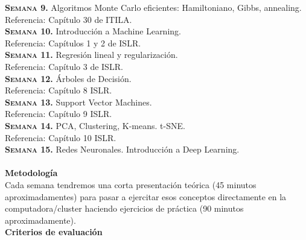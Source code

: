 \documentclass[letterpaper,10pt,onecolumn]{article}
\begin{document}
\noindent\textbf{\textsc{Semana 9.}}
Algoritmos Monte Carlo eficientes: Hamiltoniano, Gibbs, annealing. \\
Referencia: Cap\'itulo 30 de ITILA.
\\[-0.3cm] 

\noindent\textbf{\textsc{Semana 10.}}  
Introducci\'on a Machine Learning. \\
Referencia: Cap\'itulos 1 y 2 de ISLR.
\\[-0.3cm] 

\noindent\textbf{\textsc{Semana 11.}}  
Regresi\'on lineal y regularizaci\'on.\\
Referencia: Cap\'itulo 3 de ISLR.
\\[-0.3cm]

\noindent\textbf{\textsc{Semana 12.}} 
\'Arboles de Decisi\'on.\\
Referencia: Cap\'itulo 8 ISLR. 
\\[-0.3cm]  

\noindent\textbf{\textsc{Semana 13.}} 
Support Vector Machines.\\
Referencia: Cap\'itulo 9 ISLR.
\\[-0.3cm] 

\noindent\textbf{\textsc{Semana 14.}} 
PCA, Clustering, K-means. t-SNE.\\
Referencia: Cap\'itulo 10 ISLR. 
\\[-0.3cm] 

\noindent\textbf{\textsc{Semana 15.}} 
Redes Neuronales. Introducci\'on a Deep Learning.\\
\\[-0.1cm]  


\noindent\textbf{\large {} \quad
  Metodolog\'ia}\\[-0.2cm] 


\noindent\normalsize Cada semana tendremos una corta presentaci\'on
te\'orica (45 minutos aproximadamentes) para pasar a ejercitar esos
conceptos directamente en la computadora/cluster haciendo
ejercicios de pr\'actica (90 minutos aproximadamente). \\[0.1cm]


\noindent\textbf{\large {} \quad Criterios de
  evaluaci\'on}\\[-0.2cm] 
\end{document}

